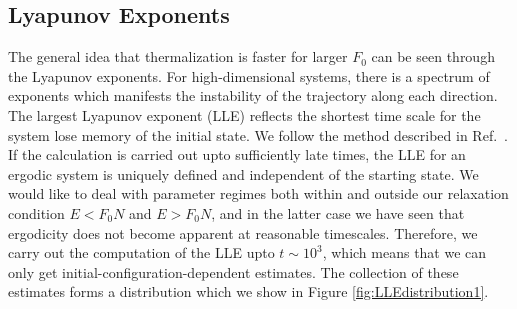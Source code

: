 \documentclass[onecolumn,pra]{revtex4-1}
\begin{document}
\subsection{Lyapunov Exponents}

The general idea that thermalization is faster for larger $F_0$ can be seen through the Lyapunov
exponents.  For high-dimensional systems, there is a spectrum of exponents which manifests the
instability of the trajectory along each direction. The largest Lyapunov exponent (LLE) reflects
the shortest time scale for the system lose memory of the initial state.  We follow the method
described in Ref.~\cite{EckmannRuelle_RMP85}.  If the calculation is carried out upto sufficiently
late times, the LLE for an ergodic system is uniquely defined and independent of the starting
state.  We would like to deal with parameter regimes both within and outside our relaxation
condition $E<F_0N$ and $E>F_0N$, and in the latter case we have seen that ergodicity does not become
apparent at reasonable timescales.  Therefore, we carry out the computation of the LLE upto
$t\sim10^3$, which means that we can only get initial-configuration-dependent estimates.  The
collection of these estimates forms a distribution which we show in Figure
\ref{fig:LLEdistribution1}. 

\end{document}

